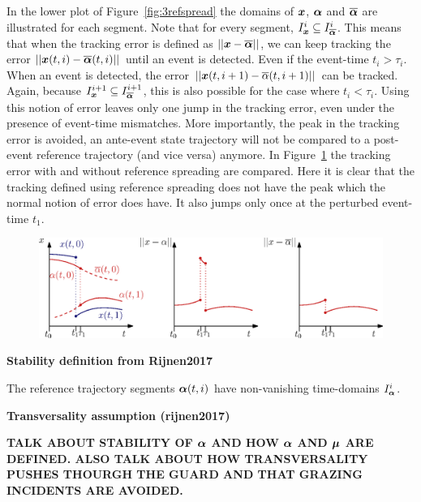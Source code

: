\documentclass[../DC2017114Bouma.tex]{subfiles}
\begin{document}
In the lower plot of Figure~\ref{fig:3refspread} the domains of ${\boldsymbol{x}}$, $\boldsymbol{\alpha}$ and $\overline{\boldsymbol{\alpha}}$ are illustrated for each segment. Note that for every segment, $I_{{\boldsymbol{x}}}^i\subseteq I_{\overline{\boldsymbol{\alpha}}}^i$. This means that when the tracking error is defined as $||{\boldsymbol{x}}-\overline{\boldsymbol{\alpha}}||$, we can keep tracking the error $||{\boldsymbol{x}}(t,i)-\overline{\boldsymbol{\alpha}}(t,i)||$ until an event is detected. Even if the event-time $t_i>\tau_i$. When an event is detected, the error  $||{\boldsymbol{x}}(t,i+1)-\overline{\alpha}(t,i+1)||$ can be tracked. Again, because $I_{{\boldsymbol{x}}}^{i+1}\subseteq I_{\overline{\boldsymbol{\alpha}}}^{i+1}$, this is also possible for the case where $t_i<\tau_i$. Using this notion of error leaves only one jump in the tracking error, even under the presence of event-time mismatches. More importantly, the peak in the tracking error is avoided, an ante-event state trajectory will not be compared to a post-event reference trajectory (and vice versa) anymore. In Figure~\ref{fig:3refspreaderrors} the tracking error with and without reference spreading are compared. Here it is clear that the tracking defined using reference spreading does not have the peak which the normal notion of error does have. It also jumps only once at the perturbed event-time $t_1$.
\begin{figure}[h]
\centering
\includegraphics[width=\textwidth]{refspreaderrors.eps}\caption{} \label{fig:3refspreaderrors}
\end{figure}

\textbf{Stability definition from Rijnen2017}

\begin{myass}
The reference trajectory segments $\boldsymbol{\alpha}(t,i)$ have non-vanishing time-domains $I_{\boldsymbol{\alpha}}^i$.\label{ass:nonzeno}
\end{myass}

\textbf{Transversality assumption (rijnen2017)}

\textbf{TALK ABOUT STABILITY OF $\boldsymbol{\alpha}$ AND HOW $\boldsymbol{\alpha}$ AND $\boldsymbol{\mu}$ ARE DEFINED. ALSO TALK ABOUT HOW TRANSVERSALITY PUSHES THOURGH THE GUARD AND THAT GRAZING INCIDENTS ARE AVOIDED.}
\end{document}
